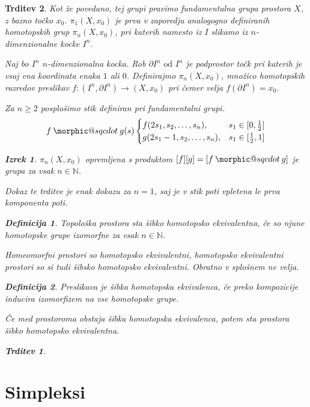 \documentclass[a4paper,12pt]{article}
\makeatletter
\DeclareRobustCommand{\sqcdot}{\mathbin{\mathpalette\morphic@sqcdot\relax}}
\newcommand{\morphic@sqcdot}[2]{%
\sbox\z@{$\m@th#1\centerdot$}%
\ht\z@=.33333\ht\z@
\vcenter{\box\z@}%
}
\theoremstyle{definition}
\newtheorem{definicija}{Definicija}
\theoremstyle{plain}
\newtheorem{izrek}{Izrek}
\theoremstyle{definition}
\theoremstyle{plain}
\newtheorem{trditev}{Trditev}
\theoremstyle{plain}
\theoremstyle{plain}
\theoremstyle{plain}
\makeatother
\begin{document}
\begin{trditev}
Kot že povedano, tej grupi pravimo fundamentalna grupa prostora $X$, z bazno točko $x_0$. $\pi_1(X,x_0)$ je prva v zaporedju analogogno definiranih homotopskih grup $\pi_n(X,x_0)$, pri katerih namesto iz $I$ slikamo iz $n$-dimenzionalne kocke $I^n$.


Naj bo $I^n$ $n$-dimenzionalna kocka. Rob $\partial I^n \text{ od } I^n$ je podprostor točk pri katerih je vsaj ena koordinata enaka $1$ ali $0$. Definirajmo $\pi_n(X,x_0)$, množico homotopskih razredov preslikav $f:(I^n,\partial I^n) \rightarrow (X,x_0)$ pri čemer velja $f(\partial I^n) = x_0$.


Za $n\ge 2$ posplošimo stik definiran pri fundamentalni grupi.
$$ f\sqcdot g(s) \begin{cases}
    f(2s_1,s_2,\ldots,s_n), & s_1\in [0,\frac{1}{2}] \\
    g(2s_1-1,s_2,\ldots,s_n), & s_1 \in [\frac{1}{2},1]
\end{cases}
$$

\begin{izrek}
    $\pi_n(X,x_0)$ opremljena s produktom $[f][g] = [f\sqcdot g]$ je grupa za vsak $n \in \mathds{N}$.
\end{izrek}

Dokaz te trditve je enak dokazu za $n=1$, saj je v stik poti vpletena le prva komponenta poti.

\begin{definicija}
    Topološka prostora sta \textit{šibko homotopsko ekvivalentna}, če so njune homotopske grupe izomorfne za vsak $n \in \mathds{N}$.
\end{definicija}

Homeomorfni prostori so homotopsko ekvivalentni, homotopsko ekvivalentni prostori so si tudi šibsko homotopsko ekvivalentni. Obratno v splošnem ne velja.

\begin{definicija}
    Preslikava je \textit{šibka homotopska ekvivalenca}, če preko kompozicije inducira izomorfizem na vse homotopske grupe.
\end{definicija}
Če med prostoroma obstaja šibka homotopska ekvivalenca, potem sta prostora šibko homotopsko ekvivalentna.

\begin{trditev}
    
\end{trditev}

\section{Simpleksi}


\end{trditev}
\end{document}
